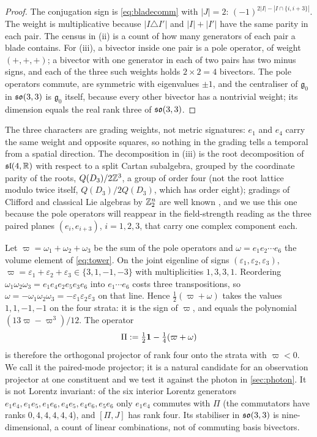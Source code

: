 \begin{proof}
The conjugation sign is \eqref{eq:bladecomm} with $|J|=2$: $(-1)^{2|I|-|I\cap\{i,i+3\}|}$. The weight is multiplicative because
$|I\triangle I'|$ and $|I|+|I'|$ have the same parity in each pair. The census in (ii) is a count of how many generators of
each pair a blade contains. For (iii), a bivector inside one pair is a pole operator, of weight $(+,+,+)$; a bivector with one
generator in each of two pairs has two minus signs, and each of the three such weights holds $2\times2=4$ bivectors. The
pole operators commute, are symmetric with eigenvalues $\pm1$, and the centraliser of $\mathfrak g_0$ in $\mathfrak{so}(3,3)$ is
$\mathfrak g_0$ itself, because every other bivector has a nontrivial weight; its dimension equals the real rank three of
$\mathfrak{so}(3,3)$.
\end{proof}

The three characters are grading weights, not metric signatures: $e_1$ and $e_4$ carry the same weight and opposite squares,
so nothing in the grading tells a temporal from a spatial direction. The decomposition in (iii) is the root decomposition of
$\mathfrak{sl}(4,\mathbb{R})$ with respect to a split Cartan subalgebra, grouped by the coordinate parity of the roots, $Q(D_3)/2\mathbb{Z}^3$, a group of order four
(not the root lattice modulo twice itself, $Q(D_3)/2Q(D_3)$, which has order eight); gradings of Clifford and
classical Lie algebras by $\mathbb{Z}_2^n$ are well known \cite{MosnaMirallesVaz}, and we use this one because the pole operators will
reappear in the field-strength reading as the three paired planes $(e_i,e_{i+3})$, $i=1,2,3$, that carry one complex component each.

\begin{example}
\label{ex:pairedmode}
Let $\varpi=\omega_1+\omega_2+\omega_3$ be the sum of the pole operators and $\omega=e_1e_2\cdots e_6$ the volume element of
\eqref{eq:tower}. On the joint eigenline of signs $(\varepsilon_1,\varepsilon_2,\varepsilon_3)$, $\varpi=\varepsilon_1+\varepsilon_2+\varepsilon_3\in\{3,1,-1,-3\}$
with multiplicities $1,3,3,1$. Reordering $\omega_1\omega_2\omega_3=e_1e_4e_2e_5e_3e_6$ into $e_1\cdots e_6$ costs three
transpositions, so $\omega=-\omega_1\omega_2\omega_3=-\varepsilon_1\varepsilon_2\varepsilon_3$ on that line. Hence $\tfrac12(\varpi+\omega)$ takes the
values $1,1,-1,-1$ on the four strata: it is the sign of $\varpi$, and equals the polynomial $(13\varpi-\varpi^3)/12$.
The operator
\begin{equation}
\label{eq:Piclosed}
\Pi:=\tfrac12\mathbf 1-\tfrac14(\varpi+\omega)
\end{equation}
is therefore the orthogonal projector of rank four onto the strata with $\varpi<0$. We call it the paired-mode projector; it
is a natural candidate for an observation projector at one constituent and we test it against the photon in
\cref{sec:photon}. It is not Lorentz invariant: of the six interior Lorentz generators $e_1e_4,e_1e_5,e_1e_6,e_4e_5,e_4e_6,e_5e_6$ only
$e_1e_4$ commutes with $\Pi$ (the commutators have ranks $0,4,4,4,4,4$), and $[\Pi,J]$ has rank four. Its stabiliser in $\mathfrak{so}(3,3)$ is
nine-dimensional, a count of linear combinations, not of commuting basis bivectors.
\end{example}

